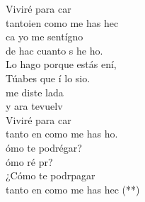 \documentclass[12pt]{article}
\begin{document}
\begin{multicols*}{2}
\begin{cancion}
\begin{chorus}
	Viviré para car \\
	tantoien como me has hec \\
	ca yo me sentígno \\
	de hac cuanto s he ho.\\
	Lo hago porque estás ení, \\
	Túabes que í lo sio.\\
	 me diste lada \\
	y ara tevuelv\\
	Viviré para car\\
	tanto en como me has ho.\\
	ómo te podrégar?\\
	ómo ré pr?\\
	¿Cómo te podrpagar \\
	tanto en como me has hec (**)\\
	\end{chorus}%
	\jump\\
\end{cancion}%


\end{multicols*}
\end{document}
